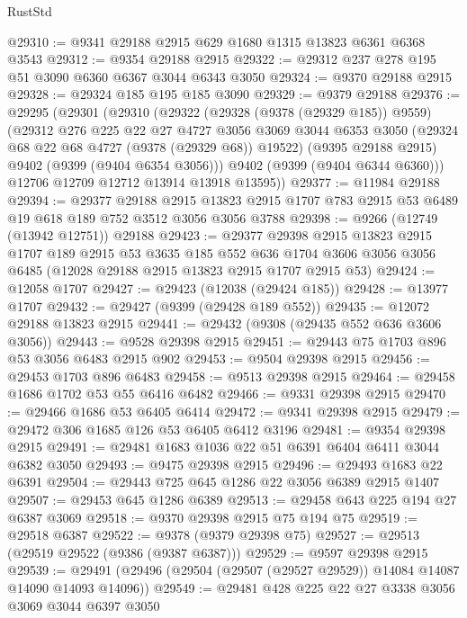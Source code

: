 \begin{lexlean}{RustStd}
\begin{coremodule}
@29310 := @9341 @29188 @2915 @629 @1680 @1315 @13823 @6361 @6368 @3543
@29312 := @9354 @29188 @2915
@29322 := @29312 @237 @278 @195 @51 @3090 @6360 @6367 @3044 @6343 @3050
@29324 := @9370 @29188 @2915
@29328 := @29324 @185 @195 @185 @3090
@29329 := @9379 @29188
@29376 := @29295
    (@29301
      (@29310
        (@29322
          (@29328 (@9378 (@29329 @185)) @9559)
          (@29312
            @276
            @225
            @22
            @27
            @4727
            @3056
            @3069
            @3044
            @6353
            @3050
            (@29324 @68 @22 @68 @4727 (@9378 (@29329 @68)) @19522)
            (@9395 @29188 @2915)
            @9402
            (@9399 (@9404 @6354 @3056)))
          @9402
          (@9399 (@9404 @6344 @6360)))
        @12706
        @12709
        @12712
        @13914
        @13918
        @13595))
@29377 := @11984 @29188
@29394 := @29377
    @29188
    @2915
    @13823
    @2915
    @1707
    @783
    @2915
    @53
    @6489
    @19
    @618
    @189
    @752
    @3512
    @3056
    @3056
    @3788
@29398 := @9266 (@12749 (@13942 @12751)) @29188
@29423 := @29377
    @29398
    @2915
    @13823
    @2915
    @1707
    @189
    @2915
    @53
    @3635
    @185
    @552
    @636
    @1704
    @3606
    @3056
    @3056
    @6485
    (@12028 @29188 @2915 @13823 @2915 @1707 @2915 @53)
@29424 := @12058 @1707
@29427 := @29423 (@12038 (@29424 @185))
@29428 := @13977 @1707
@29432 := @29427 (@9399 (@29428 @189 @552))
@29435 := @12072 @29188 @13823 @2915
@29441 := @29432 (@9308 (@29435 @552 @636 @3606 @3056))
@29443 := @9528 @29398 @2915
@29451 := @29443 @75 @1703 @896 @53 @3056 @6483 @2915 @902
@29453 := @9504 @29398 @2915
@29456 := @29453 @1703 @896 @6483
@29458 := @9513 @29398 @2915
@29464 := @29458 @1686 @1702 @53 @55 @6416 @6482
@29466 := @9331 @29398 @2915
@29470 := @29466 @1686 @53 @6405 @6414
@29472 := @9341 @29398 @2915
@29479 := @29472 @306 @1685 @126 @53 @6405 @6412 @3196
@29481 := @9354 @29398 @2915
@29491 := @29481 @1683 @1036 @22 @51 @6391 @6404 @6411 @3044 @6382 @3050
@29493 := @9475 @29398 @2915
@29496 := @29493 @1683 @22 @6391
@29504 := @29443 @725 @645 @1286 @22 @3056 @6389 @2915 @1407
@29507 := @29453 @645 @1286 @6389
@29513 := @29458 @643 @225 @194 @27 @6387 @3069
@29518 := @9370 @29398 @2915 @75 @194 @75
@29519 := @29518 @6387
@29522 := @9378 (@9379 @29398 @75)
@29527 := @29513 (@29519 @29522 (@9386 (@9387 @6387)))
@29529 := @9597 @29398 @2915
@29539 := @29491 (@29496 (@29504 (@29507 (@29527 @29529)) @14084 @14087 @14090 @14093 @14096))
@29549 := @29481 @428 @225 @22 @27 @3338 @3056 @3069 @3044 @6397 @3050

\end{coremodule}
\end{lexlean}
